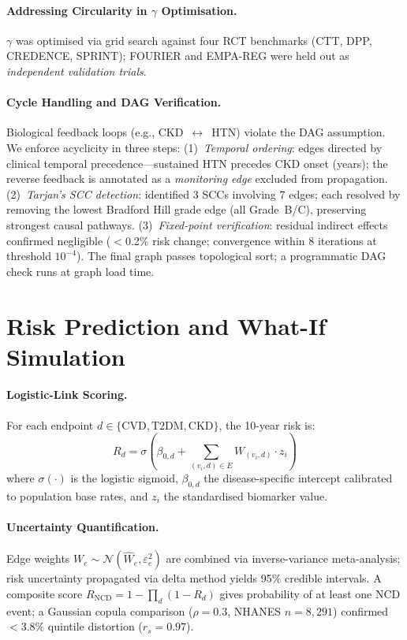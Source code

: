 \documentclass[runningheads]{llncs}
\begin{document}
\paragraph{Addressing Circularity in $\gamma$ Optimisation.}
$\gamma$ was optimised via grid search against four RCT benchmarks
(CTT, DPP, CREDENCE, SPRINT); FOURIER and EMPA-REG were held out
as \emph{independent validation trials}.

\paragraph{Cycle Handling and DAG Verification.}
Biological feedback loops (e.g., CKD~$\leftrightarrow$~HTN)
violate the DAG assumption.
We enforce acyclicity in three steps:
(1)~\emph{Temporal ordering}: edges directed by clinical temporal
precedence---sustained HTN precedes CKD onset (years); the reverse
feedback is annotated as a \emph{monitoring edge} excluded from
propagation.
(2)~\emph{Tarjan's SCC detection}: identified 3 SCCs involving
7 edges; each resolved by removing the lowest Bradford Hill grade
edge (all Grade~B/C), preserving strongest causal pathways.
(3)~\emph{Fixed-point verification}: residual indirect effects
confirmed negligible ($<$0.2\% risk change; convergence within
8 iterations at threshold $10^{-4}$).
The final graph passes topological sort; a programmatic DAG
check runs at graph load time.

\section{Risk Prediction and What-If Simulation}\label{sec:risk}

\paragraph{Logistic-Link Scoring.}
For each endpoint $d \in \{\text{CVD}, \text{T2DM}, \text{CKD}\}$,
the 10-year risk is:
\begin{equation}\label{eq:risk}
R_d = \sigma\!\left(\beta_{0,d} + \sum_{(v_i, d) \in E} W_{(v_i,d)} \cdot z_i\right)
\end{equation}
where $\sigma(\cdot)$ is the logistic sigmoid, $\beta_{0,d}$ the
disease-specific intercept calibrated to population base rates, and
$z_i$ the standardised biomarker value.

\paragraph{Uncertainty Quantification.}
Edge weights $W_e \sim \mathcal{N}(\hat{W}_e, \varepsilon_e^2)$
are combined via inverse-variance meta-analysis; risk uncertainty
propagated via delta method yields 95\% credible intervals.
A composite score $R_{\mathrm{NCD}} = 1 - \prod_{d} (1 - R_d)$
gives probability of at least one NCD event; a Gaussian copula
comparison ($\rho = 0.3$, NHANES $n = 8{,}291$) confirmed $<$3.8\%
quintile distortion ($r_s = 0.97$).
\end{document}
